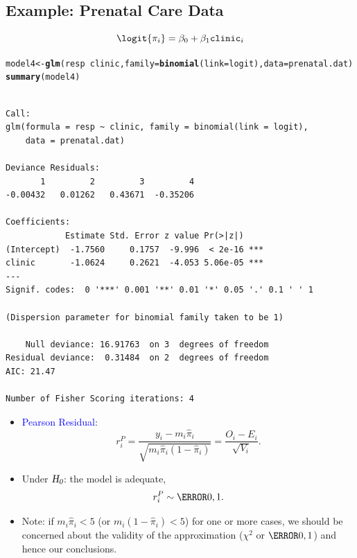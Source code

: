 \documentclass{article}\usepackage[]{graphicx}\usepackage[svgnames]{xcolor}
\makeatletter
\newcommand{\hlopt}[1]{\textcolor[rgb]{0,0,0}{#1}}%
\newcommand{\hlstd}[1]{\textcolor[rgb]{0.345,0.345,0.345}{#1}}%
\newcommand{\hlkwb}[1]{\textcolor[rgb]{0.69,0.353,0.396}{#1}}%
\newcommand{\hlkwc}[1]{\textcolor[rgb]{0.333,0.667,0.333}{#1}}%
\newcommand{\hlkwd}[1]{\textcolor[rgb]{0.737,0.353,0.396}{\textbf{#1}}}%
\newenvironment{kframe}{%
 \def\at@end@of@kframe{}%
 \ifinner\ifhmode%
  \def\at@end@of@kframe{\end{minipage}}%
  \begin{minipage}{\columnwidth}%
 \fi\fi%
 \def\FrameCommand##1{\hskip\@totalleftmargin \hskip-\fboxsep
 \colorbox{shadecolor}{##1}\hskip-\fboxsep
     \hskip-\linewidth \hskip-\@totalleftmargin \hskip\columnwidth}%
 \MakeFramed {\advance\hsize-\width
   \@totalleftmargin\z@ \linewidth\hsize
   \@setminipage}}%
 {\par\unskip\endMakeFramed%
 \at@end@of@kframe}
\newenvironment{knitrout}{}{} %
\newcommand{\HN}{\textsl{H}_{\textsl{0}}}%
\makeatother
\begin{document}
\subsection*{Example: Prenatal Care Data}
\[ \logit{\pi_i}=\beta_0+\beta_1\texttt{clinic}_i \]
\begin{knitrout}
\color{fgcolor}\begin{kframe}
\begin{alltt}
\hlstd{model4} \hlkwb{<-} \hlkwd{glm}\hlstd{(resp} \hlopt{~} \hlstd{clinic,} \hlkwc{family} \hlstd{=} \hlkwd{binomial}\hlstd{(}\hlkwc{link} \hlstd{= logit),} \hlkwc{data} \hlstd{= prenatal.dat)}
\hlkwd{summary}\hlstd{(model4)}
\end{alltt}
\begin{verbatim}

Call:
glm(formula = resp ~ clinic, family = binomial(link = logit), 
    data = prenatal.dat)

Deviance Residuals: 
       1         2         3         4  
-0.00432   0.01262   0.43671  -0.35206  

Coefficients:
            Estimate Std. Error z value Pr(>|z|)    
(Intercept)  -1.7560     0.1757  -9.996  < 2e-16 ***
clinic       -1.0624     0.2621  -4.053 5.06e-05 ***
---
Signif. codes:  0 '***' 0.001 '**' 0.01 '*' 0.05 '.' 0.1 ' ' 1

(Dispersion parameter for binomial family taken to be 1)

    Null deviance: 16.91763  on 3  degrees of freedom
Residual deviance:  0.31484  on 2  degrees of freedom
AIC: 21.47

Number of Fisher Scoring iterations: 4
\end{verbatim}
\end{kframe}
\end{knitrout}
\begin{itemize}
    \item \textcolor{Blue}{Pearson Residual}:
          \[ r_i^P=\frac{y_i-m_i\hat{\pi}_i}{\sqrt{m_i\hat{\pi}_i(1-\hat{\pi}_i)}}=\frac{O_i-E_i}{\sqrt{V_i}}.  \]
    \item Under $ \HN $: the model is adequate,
          \[ r_i^P \sim \N{0,1}. \]
    \item Note: if $ m_i\hat{\pi}_i<5 $ (or $ m_i(1-\hat{\pi}_i)<5 $) for one or more cases, we should be concerned about
          the validity of the approximation ($ \chi^2 $ or $ \N{0,1} $) and hence our conclusions.
\end{itemize}
\end{document}
